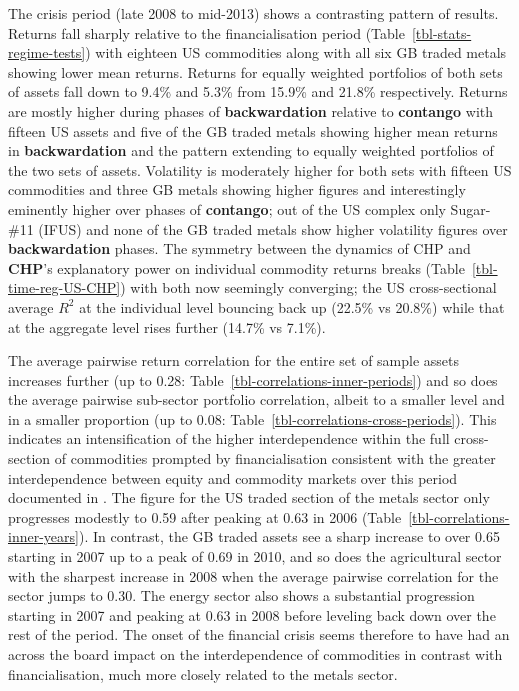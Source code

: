\documentclass[
  authoryear,
  preprint,
  3p]{elsarticle}
\begin{document}
\bigskip
\bigskip

The crisis period (late 2008 to mid-2013) shows a contrasting pattern of
results. Returns fall sharply relative to the financialisation period
(Table~\ref{tbl-stats-regime-tests}) with eighteen US commodities along
with all six GB traded metals showing lower mean returns. Returns for
equally weighted portfolios of both sets of assets fall down to 9.4\%
and 5.3\% from 15.9\% and 21.8\% respectively. Returns are mostly higher
during phases of \textbf{backwardation} relative to \textbf{contango}
with fifteen US assets and five of the GB traded metals showing higher
mean returns in \textbf{backwardation} and the pattern extending to
equally weighted portfolios of the two sets of assets. Volatility is
moderately higher for both sets with fifteen US commodities and three GB
metals showing higher figures and interestingly eminently higher over
phases of \textbf{contango}; out of the US complex only Sugar-\#11
(IFUS) and none of the GB traded metals show higher volatility figures
over \textbf{backwardation} phases. The symmetry between the dynamics of
CHP and \textbf{CHP}'s explanatory power on individual commodity returns
breaks (Table~\ref{tbl-time-reg-US-CHP}) with both now seemingly
converging; the US cross-sectional average \(R^{2}\) at the individual
level bouncing back up (22.5\% vs 20.8\%) while that at the aggregate
level rises further (14.7\% vs 7.1\%).

\medskip

The average pairwise return correlation for the entire set of sample
assets increases further (up to 0.28:
Table~\ref{tbl-correlations-inner-periods}) and so does the average
pairwise sub-sector portfolio correlation, albeit to a smaller level and
in a smaller proportion (up to 0.08:
Table~\ref{tbl-correlations-cross-periods}). This indicates an
intensification of the higher interdependence within the full
cross-section of commodities prompted by financialisation consistent
with the greater interdependence between equity and commodity markets
over this period documented in
\citet{silvennoinen_financialisation_2013}. The figure for the US traded
section of the metals sector only progresses modestly to 0.59 after
peaking at 0.63 in 2006 (Table~\ref{tbl-correlations-inner-years}). In
contrast, the GB traded assets see a sharp increase to over 0.65
starting in 2007 up to a peak of 0.69 in 2010, and so does the
agricultural sector with the sharpest increase in 2008 when the average
pairwise correlation for the sector jumps to 0.30. The energy sector
also shows a substantial progression starting in 2007 and peaking at
0.63 in 2008 before leveling back down over the rest of the period. The
onset of the financial crisis seems therefore to have had an across the
board impact on the interdependence of commodities in contrast with
financialisation, much more closely related to the metals sector.
\end{document}

